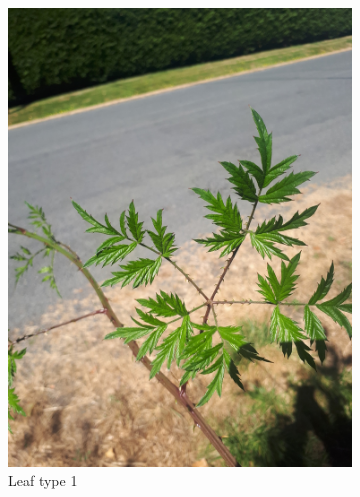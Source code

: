 \begin{figure}
\centering
\begin{subfigure}{0.48\textwidth}
    \includegraphics[width=\textwidth]{rubus/laciniatus_leaf_01}
    \caption{Leaf type 1}
    \label{fig:rub:laciniatus:leaf}
\end{subfigure}
\hfill
\begin{subfigure}{0.48\textwidth}

\end{subfigure}
\end{figure}

